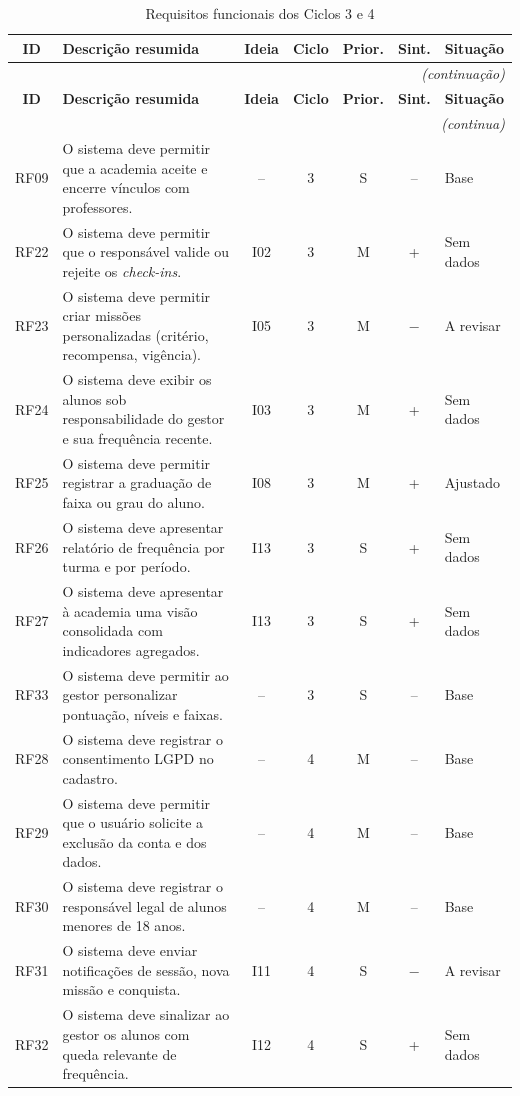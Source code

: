 \begin{quadrolongo}
\begin{longtable}{|c|p{6.6cm}|c|c|c|c|p{1.6cm}|}
  \caption{Requisitos funcionais dos Ciclos 3 e 4}\label{qua:rf2}\\
  \hline
  \textbf{ID} & \textbf{Descrição resumida} & \textbf{Ideia} & \textbf{Ciclo} & \textbf{Prior.} & \textbf{Sint.} & \textbf{Situação} \\ \hline
\endfirsthead
  \multicolumn{7}{r}{\textit{(continuação)}}\\
  \hline
  \textbf{ID} & \textbf{Descrição resumida} & \textbf{Ideia} & \textbf{Ciclo} & \textbf{Prior.} & \textbf{Sint.} & \textbf{Situação} \\ \hline
\endhead
  \multicolumn{7}{r}{\textit{(continua)}}\\
\endfoot
\endlastfoot
    RF09 & O sistema deve permitir que a academia aceite e encerre vínculos com professores. & -- & 3 & S & -- & Base \\ \hline
    RF22 & O sistema deve permitir que o responsável valide ou rejeite os \textit{check-ins}. & I02 & 3 & M & + & Sem dados \\ \hline
    RF23 & O sistema deve permitir criar missões personalizadas (critério, recompensa, vigência). & I05 & 3 & M & $-$ & A revisar \\ \hline
    RF24 & O sistema deve exibir os alunos sob responsabilidade do gestor e sua frequência recente. & I03 & 3 & M & + & Sem dados \\ \hline
    RF25 & O sistema deve permitir registrar a graduação de faixa ou grau do aluno. & I08 & 3 & M & + & Ajustado \\ \hline
    RF26 & O sistema deve apresentar relatório de frequência por turma e por período. & I13 & 3 & S & + & Sem dados \\ \hline
    RF27 & O sistema deve apresentar à academia uma visão consolidada com indicadores agregados. & I13 & 3 & S & + & Sem dados \\ \hline
    RF33 & O sistema deve permitir ao gestor personalizar pontuação, níveis e faixas. & -- & 3 & S & -- & Base \\ \hline
    RF28 & O sistema deve registrar o consentimento LGPD no cadastro. & -- & 4 & M & -- & Base \\ \hline
    RF29 & O sistema deve permitir que o usuário solicite a exclusão da conta e dos dados. & -- & 4 & M & -- & Base \\ \hline
    RF30 & O sistema deve registrar o responsável legal de alunos menores de 18 anos. & -- & 4 & M & -- & Base \\ \hline
    RF31 & O sistema deve enviar notificações de sessão, nova missão e conquista. & I11 & 4 & S & $-$ & A revisar \\ \hline
    RF32 & O sistema deve sinalizar ao gestor os alunos com queda relevante de frequência. & I12 & 4 & S & + & Sem dados \\ \hline
\end{longtable}
\end{quadrolongo}

